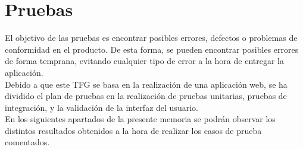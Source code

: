 \chapter{Pruebas}

El objetivo de las pruebas es encontrar posibles errores, defectos o problemas de conformidad en el producto. De esta forma, se pueden encontrar posibles errores de forma temprana, evitando cualquier tipo de error a la hora de entregar la aplicación. \\

Debido a que este TFG se basa en la realización de una aplicación web, se ha dividido el plan de pruebas en la realización de pruebas unitarias, pruebas de integración, y la validación de la interfaz del usuario.
\\

En los siguientes apartados de la presente memoria se podrán observar los distintos resultados obtenidos a la hora de realizar los casos de prueba comentados.




